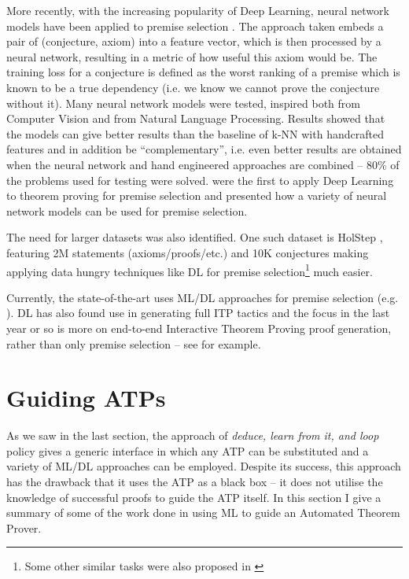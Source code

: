 \documentclass{article}
\begin{document}
More recently, with the increasing popularity of Deep Learning, neural network
models have been applied to premise selection \citep{DeepMath}. The approach
taken embeds a pair of (conjecture, axiom) into a feature vector, which is then
processed by a neural network, resulting in a metric of how useful this axiom
would be. The training loss for a conjecture is defined as the worst ranking of
a premise which is known to be a true dependency (i.e. we know we cannot prove
the conjecture without it). Many neural network models were tested, inspired
both from Computer Vision and from Natural Language Processing. Results showed
that the models can give better results than the baseline of k-NN with
handcrafted features and in addition be ``complementary'', i.e. even better
results are obtained when the neural network and hand engineered approaches are
combined -- 80\% of the problems used for testing were solved. \cite{DeepMath}
were the first to apply Deep Learning to theorem proving for premise
selection and presented how a variety of neural network models can be used for
premise selection.

The need for larger datasets was also identified. One such dataset is HolStep
\citep{HolStep}, featuring 2M statements (axioms/proofs/etc.) and 10K
conjectures making applying data hungry techniques like DL for premise
selection\footnote{Some other similar tasks were also proposed in
\cite{HolStep}} much easier.

Currently, the state-of-the-art uses ML/DL approaches for premise selection
(e.g. \cite{DeepGraph, GNNsForTP}). DL has also found use in generating full ITP
tactics and the focus in the last year or so is more on end-to-end Interactive
Theorem Proving proof generation, rather than only premise selection -- see
\cite{LearningToProveITP, GamePad} for example.

\section{Guiding ATPs}\label{sec:ATP}

As we saw in the last section, the approach of \emph{deduce, learn from it, and
loop} policy gives a generic interface in which any ATP can be substituted
and a variety of ML/DL approaches can be employed. Despite its success, this
approach has the drawback that it uses the ATP as a black box -- it does not
utilise the knowledge of successful proofs to guide the ATP itself. In this
section I give a summary of some of the work done in using ML to guide an
Automated Theorem Prover.
\end{document}
